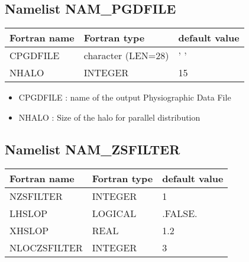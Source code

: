\subsection{Namelist NAM\_PGDFILE}

\begin{center}
\begin{tabular} {|l|l|l|}
\hline
Fortran name & Fortran type & default value\\
\hline
\hline
CPGDFILE      & character (LEN=28) & ' '           \\
NHALO         & INTEGER      & 15 \\
\hline
\end{tabular}
\end{center}

\begin{itemize}
\item CPGDFILE : name of the output Physiographic Data File
\item NHALO :  Size of the halo for parallel distribution

\end{itemize}
\subsection{Namelist NAM\_ZSFILTER}

\begin{center}
\begin{tabular} {|l|l|l|}
\hline
Fortran name & Fortran type & default value\\
\hline
\hline
NZSFILTER       & INTEGER      & 1 \\
LHSLOP       & LOGICAL      & .FALSE. \\
XHSLOP       & REAL      & 1.2 \\
NLOCZSFILTER & INTEGER & 3 \\
\hline
\end{tabular}
\end{center}


